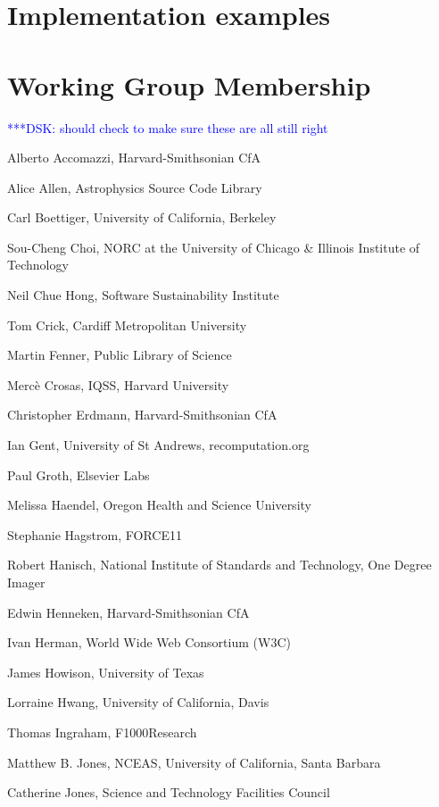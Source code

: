 \documentclass[11pt, oneside]{amsart}
\newcommand{\katznote}[1]{ {\textcolor{blue} { ***DSK: #1 }}}
\begin{document}
\section{Implementation examples}
\label{sec:examples}

\appendix

\section{Working Group Membership}
\label{app:wg_members}

\katznote{should check to make sure these are all still right}

Alberto Accomazzi, Harvard-Smithsonian CfA

Alice Allen, Astrophysics Source Code Library

Carl Boettiger, University of California,  Berkeley

Sou-Cheng Choi, NORC at the University of Chicago \& Illinois Institute of Technology	

Neil Chue Hong, Software Sustainability Institute	

Tom Crick, Cardiff Metropolitan University	

Martin Fenner, Public Library of Science	

Merc\`e Crosas, IQSS, Harvard University	

Christopher Erdmann, Harvard-Smithsonian CfA	

Ian Gent, University of St Andrews, recomputation.org	

Paul Groth, Elsevier Labs	

Melissa Haendel, Oregon Health and Science University

Stephanie Hagstrom, FORCE11	

Robert Hanisch, National Institute of Standards and Technology, One Degree Imager	

Edwin Henneken, Harvard-Smithsonian CfA	

Ivan Herman, World Wide Web Consortium (W3C)

James Howison, University of Texas	

Lorraine Hwang, University of California,  Davis	

Thomas Ingraham, F1000Research	

Matthew B. Jones, NCEAS, University of California,  Santa Barbara	

Catherine Jones, Science and Technology Facilities Council
\end{document}
